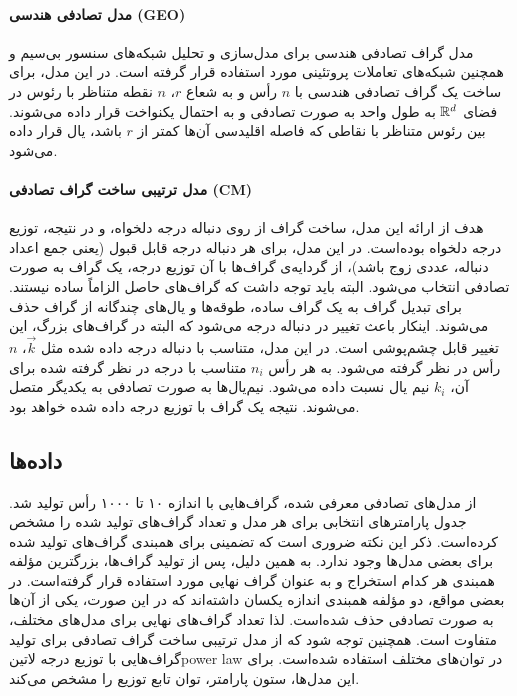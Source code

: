 \paragraph{مدل تصادفی هندسی (GEO)}
مدل گراف تصادفی هندسی برای مدل‌سازی و تحلیل شبکه‌های سنسور بی‌سیم و همچنین شبکه‌های تعاملات پروتئینی مورد استفاده قرار گرفته است. در این مدل، 
برای ساخت یک گراف تصادفی هندسی با $n$ رأس و به شعاع $r$، $n$ نقطه متناظر با رئوس در فضای $\mathbb{R}^d$ به طول واحد به صورت تصادفی و به احتمال یکنواخت قرار داده می‌شوند. بین رئوس متناظر با نقاطی که فاصله اقلیدسی آن‌ها کمتر از $r$ باشد، یال قرار داده می‌شود.

\paragraph{مدل ترتیبی ساخت گراف تصادفی (CM)}
هدف از ارائه این مدل، ساخت گراف از روی دنباله درجه دلخواه، و در نتیجه، توزیع درجه دلخواه بوده‌است. در این مدل، برای هر دنباله درجه قابل قبول (یعنی جمع اعداد دنباله، عددی زوج باشد)، از گردایه‌ی گراف‌ها با آن توزیع درجه، یک گراف به صورت تصادفی انتخاب می‌شود. البته باید توجه داشت که گراف‌های حاصل الزاماً ساده نیستند. برای تبدیل گراف به یک گراف ساده، طوقه‌ها و یال‌های چندگانه از گراف حذف می‌شوند. اینکار باعث تغییر در دنباله درجه می‌شود که البته در گراف‌های بزرگ، این تغییر قابل چشم‌پوشی است. در این مدل، متناسب با دنباله درجه داده شده مثل $\vec{k}$، $n$ رأس در نظر گرفته می‌شود. به هر رأس $n_i$ متناسب با درجه در نظر گرفته شده برای آن، $k_i$ نیم یال نسبت داده می‌شود. نیم‌یال‌ها به صورت تصادفی به یکدیگر متصل می‌شوند. نتیجه یک گراف با توزیع درجه داده‌ شده خواهد بود.

\subsection{داده‌‌ها}
از مدل‌های تصادفی معرفی شده، گراف‌هایی با اندازه ۱۰ تا ۱۰۰۰ رأس تولید شد. جدول  پارامترهای انتخابی برای هر مدل و تعداد گراف‌های تولید شده را مشخص کرده‌است. ذکر این نکته ضروری است که تضمینی برای همبندی گراف‌های تولید شده برای بعضی مدل‌ها وجود ندارد. به همین دلیل، پس از تولید گراف‌ها، بزرگترین مؤلفه همبندی هر کدام استخراج و به عنوان گراف نهایی مورد استفاده قرار گرفته‌است. در بعضی مواقع، دو مؤلفه همبندی اندازه یکسان داشته‌اند که در این صورت، یکی از آن‌ها به صورت تصادفی حذف شده‌است. لذا تعداد گراف‌های نهایی برای مدل‌های مختلف، متفاوت است. همچنین توجه شود که از مدل ترتیبی ساخت گراف تصادفی برای تولید گراف‌هایی با توزیع درجه ‌لاتین{power law} در توان‌های مختلف استفاده شده‌است. برای این مدل‌ها، ستون پارامتر، توان تابع توزیع را مشخص می‌کند.


